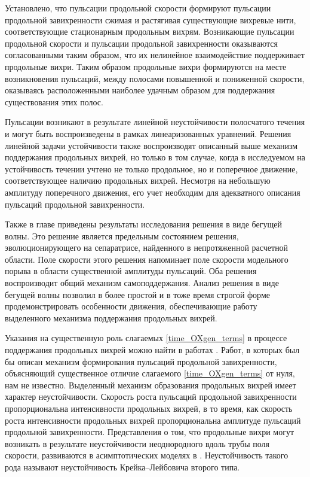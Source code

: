 Установлено, что пульсации продольной скорости формируют пульсации продольной завихренности сжимая и растягивая существующие вихревые нити, соответствующие стационарным продольным вихрям. Возникающие пульсации продольной скорости и пульсации продольной завихренности оказываются согласованными таким образом, что их нелинейное взаимодействие поддерживает продольные вихри. Таким образом продольные вихри формируются на месте возникновения пульсаций, между полосами повышенной и пониженной скорости, оказываясь расположенными наиболее удачным образом для поддержания существования этих полос.

Пульсации возникают в результате линейной неустойчивости полосчатого течения и могут быть воспроизведены в рамках линеаризованных уравнений. Решения линейной задачи устойчивости также воспроизводят описанный выше механизм поддержания продольных вихрей, но только в том случае, когда в исследуемом на устойчивость течении учтено не только продольное, но и поперечное движение, соответствующее наличию продольных вихрей. Несмотря на небольшую амплитуду поперечного движения, его учет необходим для адекватного описания пульсаций продольной завихренности. 

Также в главе приведены результаты исследования решения в виде бегущей волны. Это решение является предельным состоянием решения, эволюционирующего на сепаратрисе, найденного в непротяженной расчетной области. Поле скорости этого решения напоминает поле скорости модельного порыва в области существенной амплитуды пульсаций. Оба решения воспроизводит общий механизм самоподдержания. Анализ решения в виде бегущей волны позволил в более простой и в тоже время строгой форме продемонстрировать особенности движения, обеспечивающие работу выделенного механизма поддержания продольных вихрей. 

Указания на существенную роль слагаемых \eqref{time_OXgen_terms} в процессе поддержания продольных вихрей можно найти в работах \cite{Hamilton1995, Schoppa2002}. Работ, в которых был бы описан механизм формирования пульсаций продольной завихренности, объясняющий существенное отличие слагаемого \eqref{time_OXgen_terms} от нуля, нам не известно. Выделенный механизм образования продольных вихрей имеет характер неустойчивости. Скорость роста пульсаций продольной завихренности пропорциональна интенсивности продольных вихрей, в то время, как скорость роста интенсивности продольных вихрей пропорциональна амплитуде пульсаций продольной завихренности. Представления о том, что продольные вихри могут возникать в результате неустойчивости неоднородного вдоль трубы поля скорости, развиваются в асимптотических моделях в \cite{Craik1977, Hall2010}. Неустойчивость такого рода называют неустойчивость Крейка--Лейбовича второго типа. 


